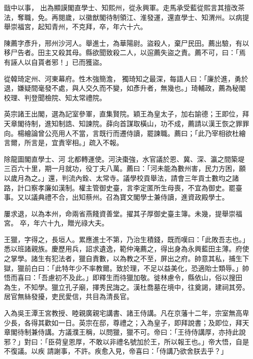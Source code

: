 \begin{pinyinscope}
 戩中以事，
 出為顯謨閣直學士、知熙州，從永興軍。走馬承受藍從熙言其擅改茶法，奪職，免。再閱歲，以徽猷閣待制領江、淮發運，還直學士、知渭州。以病提舉崇福宮，起知青州，不克拜，卒，年六十六。



 陳薦字彥升，邢州沙河人。舉進士，為華陽尉。盜殺人，棄尸民田。薦出驗，有以移尸告者。田主又殺其母。縣欲聞致殺二人，以逭薦失盜之責。薦不可，曰：「焉有誣人以自貰者邪！」已而獲盜。



 從韓琦定州、河東幕府。性木強簡澹，
 獨琦知之最深，每語人曰：「廉於進，勇於退，嫌疑間毫發不處，與人交久而不變，如彥升者，無幾也。」琦輔政，薦為秘閣校理、判登聞檢院、知太常禮院。



 英宗諸王出閣，選為記室參軍，直集賢院。穎王為皇太子，加右諭德；王即位，拜天章閣待制，進知制誥、知諫院。薛向首謀取橫山，功不成，薦請以漢王恢之罪罪向。楊繪論曾公亮用人不當，言既行而遷侍讀，罷諫職。薦曰；「此乃宰相欲杜繪言爾，所言是，宜責宰相。」疏入不報。



 除龍圖閣直學士、河
 北都轉運使。河決棗強，水官議於恩、冀、深、瀛之間築堤三百六十里，期一月就功，役丁夫八萬。薦曰：「河未能為數州害，民力方困，願以歲月為之。」還，判流內銓、太常寺。議學校貢舉法，請會三年貢士數均之諸路，計口察孝廉如漢制。權主管御史臺，言李定匿所生母喪，不宜為御史。罷臺事。又以議典禮不合，出知蔡州。召為寶文閣學士兼侍讀，進資政殿學士。



 屢求退，以為本州，命兩省燕餞資善堂。擢其子厚御史臺主簿。未幾，提舉崇福宮。
 卒，年六十九，贈光祿大夫。



 王獵，字得之，長垣人。累應進士不第，乃治生積錢，既而嘆曰：「此敗吾志也。」悉以班諸親族。慶歷用兵，詔求遺逸，範仲淹薦之，得出身為永興藍田主薄。府使之掌學。諸生有犯法者，獵自責數，以為教之不至，屏出之府。帥意其私，捕生下獄，獵前白曰：「此特年少不率教爾。致於理，不足以益美化，恐適貽士類辱。」帥悟而喜曰：「吾慮初不及此。」即釋生而待獵加敬。徙林慮令，縣依山，俗以搜田
 為生，不知學。獵立孔子廟，擇秀民誨之。漢杜喬墓在境中，往奠謁，建祠其旁。居官無絲發擾，吏民愛信，共目為清長官。



 入為吳王潭王宮教授、睦親廣親宅講書、諸王侍講。凡在京藩十二年，宗室無高卑少長，各得其歡如一日。英宗在邸，尊禮之；入為皇子，即拜說書；及即位，拜天章閣待制兼侍講。方議濮王稱，以問獵，獵不可。帝曰：「王待侍講厚，亦持此說邪？」對曰：「臣荷皇恩厚，不敢以非禮名號加於王，所以報王也。」帝大悟，自是不復議。以疾
 請謝事，不許。疾愈入見，帝喜曰：「侍講乃欲舍朕去乎？」




\end{pinyinscope}
